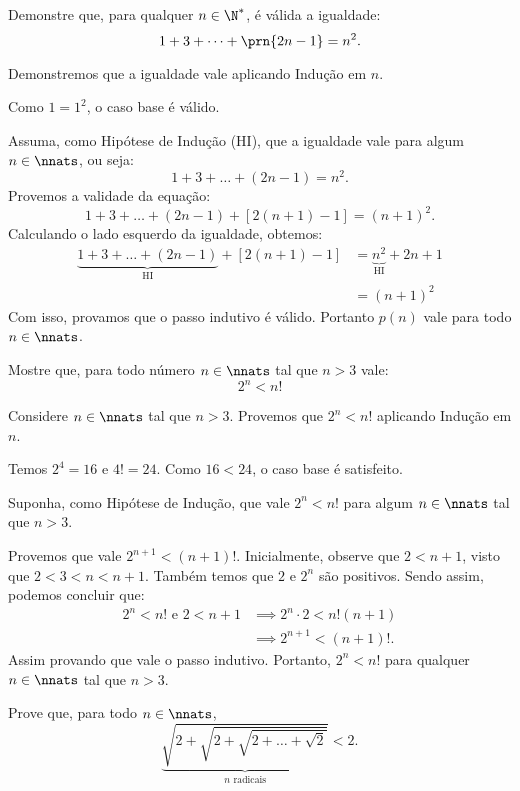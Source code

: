 \begin{example}
Demonstre que, para qualquer $n \in \N^*$, é válida a igualdade:
$$1+3+\dots +\prn {2n-1} = n^2.$$
\end{example}

\begin{solution}
Demonstremos que a igualdade vale aplicando Indução em $n$.

Como $1=1^2$, o caso base é válido.

Assuma, como Hipótese de Indução (HI), que a igualdade vale para algum $n\in \nnats$, ou seja:
$$1+3+\dots+(2n-1) = n^2.$$
Provemos a validade da equação:
$$1+3+\dots+(2n-1)+[2(n+1)-1] = (n+1)^2.$$
Calculando o lado esquerdo da igualdade, obtemos:
\begin{align*}
\underbrace{1+3+\dots+(2n-1)}_{\text{HI}} + [2(n+1)-1] & = \underbrace{n^2}_{\text{HI}} + 2n + 1 \\
& = (n + 1)^2
\end{align*}
Com isso, provamos que o passo indutivo é válido.
Portanto $p(n)$ vale para todo $n \in \nnats$.
\end{solution}

\begin{example}
Mostre que, para todo número $n \in \nnats$ tal que $n>3$ vale:
$$2^n < n!$$
\end{example}

\begin{solution}
Considere $n \in \nnats$ tal que $n >3$. Provemos que $2^n < n!$ aplicando Indução em $n$.

 Temos $2^4 = 16$ e $4! = 24$. Como $16 < 24$, o caso base é satisfeito.

Suponha, como Hipótese de Indução, que vale $2^n < n!$ para algum $n \in \nnats$ tal que $n > 3$.

Provemos que vale $2^{n+1} < (n+1)!$.
Inicialmente, observe que $2 < n + 1$, visto que $2 < 3 < n < n + 1$. Também temos que $2$ e $2^n$ são positivos. Sendo assim, podemos concluir que:
\begin{align*}
2^n < n! \text{ e } 2 < n+1 & \implies 2^n \cdot 2 < n!(n+1) \\
& \implies 2^{n+1} < (n+1)!.
\end{align*}
Assim provando que vale o passo indutivo.
Portanto, $2^n < n!$ para qualquer $n \in \nnats$ tal que $n>3$.
\end{solution}

\begin{example}
Prove  que, para todo $n \in \nnats$,
%
\begin{equation*}
\underbrace{\sqrt{2+\sqrt{2+\sqrt{2+ \dots + \sqrt 2}}}}_{n  \text{ radicais}} < 2.
\end{equation*}
\end{example}

